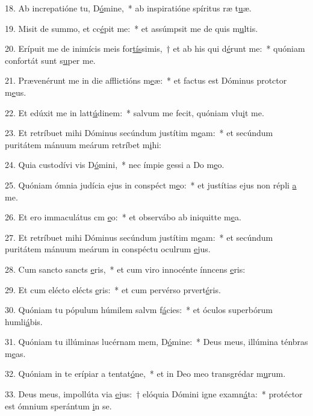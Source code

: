 18. Ab increpatióne tu, D\uline{ó}mine,~* ab inspiratióne spíritus ræ t\uline{u}æ.\par 
19. Misit de summo, et cc\uline{é}pit me:~* et assúmpsit me de quis m\uline{u}ltis.\par 
20. Erípuit me de inimícis meis for\uline{tís}simis,~† et ab his qui d\uline{é}runt me:~* quóniam confortát sunt s\uline{u}per me.\par 
21. Prævenérunt me in die afflictións m\uline{e}æ:~* et factus est Dóminus protctor m\uline{e}us.\par 
22. Et edúxit me in latt\uline{ú}dinem:~* salvum me fecit, quóniam vlu\uline{i}t me.\par 
23. Et retríbuet mihi Dóminus secúndum justítim m\uline{e}am:~* et secúndum puritátem mánuum meárum retríbet m\uline{i}hi:\par 
24. Quia custodívi vis D\uline{ó}mini,~* nec ímpie gessi a Do m\uline{e}o.\par 
25. Quóniam ómnia judícia ejus in conspéct m\uline{e}o:~* et justítias ejus non répli \uline{a} me.\par 
26. Et ero immaculátus cm \uline{e}o:~* et observábo ab iniquitte m\uline{e}a.\par 
27. Et retríbuet mihi Dóminus secúndum justítim m\uline{e}am:~* et secúndum puritátem mánuum meárum in conspéctu oculrum \uline{e}jus.\par 
28. Cum sancto sancts \uline{e}ris,~* et cum viro innocénte ínncens \uline{e}ris:\par 
29. Et cum elécto elécts \uline{e}ris:~* et cum pervérso prvert\uline{é}ris.\par 
30. Quóniam tu pópulum húmilem salvm f\uline{á}cies:~* et óculos superbórum humli\uline{á}bis.\par 
31. Quóniam tu illúminas lucérnam mem, D\uline{ó}mine:~* Deus meus, illúmina ténbras m\uline{e}as.\par 
32. Quóniam in te erípiar a tentat\uline{ó}ne,~* et in Deo meo transgrédar m\uline{u}rum.\par 
33. Deus meus, impollúta via \uline{e}jus:~† elóquia Dómini igne examn\uline{á}ta:~* protéctor est ómnium sperántum \uline{i}n se.\par 
